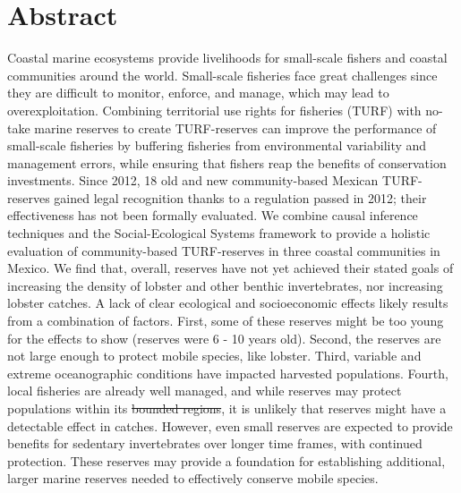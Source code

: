 \documentclass[10pt,letterpaper]{article}
\providecommand{\DIFaddtex}[1]{{\protect\color{blue}\uwave{#1}}} %
\providecommand{\DIFdeltex}[1]{{\protect\color{red}\sout{#1}}}                      %
\providecommand{\DIFaddbegin}{} %
\providecommand{\DIFaddend}{} %
\providecommand{\DIFdelbegin}{} %
\providecommand{\DIFdelend}{} %
\providecommand{\DIFadd}[1]{\texorpdfstring{\DIFaddtex{#1}}{#1}} %
\providecommand{\DIFdel}[1]{\texorpdfstring{\DIFdeltex{#1}}{}} %
\newcommand{\DIFscaledelfig}{0.5}
\newlength{\DIFdelgraphicswidth} %
\newlength{\DIFdelgraphicsheight} %
\newcommand{\DIFaddincludegraphics}[2][]{{\color{blue}\fbox{\DIFOincludegraphics[#1]{#2}}}} %
\newcommand{\DIFdelincludegraphics}[2][]{%
\sbox{\DIFdelgraphicsbox}{\DIFOincludegraphics[#1]{#2}}%
\settoboxwidth{\DIFdelgraphicswidth}{\DIFdelgraphicsbox} %
\settoboxtotalheight{\DIFdelgraphicsheight}{\DIFdelgraphicsbox} %
\scalebox{\DIFscaledelfig}{%
\parbox[b]{\DIFdelgraphicswidth}{\usebox{\DIFdelgraphicsbox}\\[-\baselineskip] \rule{\DIFdelgraphicswidth}{0em}}\llap{\resizebox{\DIFdelgraphicswidth}{\DIFdelgraphicsheight}{%
\setlength{\unitlength}{\DIFdelgraphicswidth}%
\begin{picture}(1,1)%
\thicklines\linethickness{2pt} %
{\color[rgb]{1,0,0}\put(0,0){\framebox(1,1){}}}%
{\color[rgb]{1,0,0}\put(0,0){\line( 1,1){1}}}%
{\color[rgb]{1,0,0}\put(0,1){\line(1,-1){1}}}%
\end{picture}%
}\hspace*{3pt}}} %
} %
\DeclareRobustCommand{\DIFaddbegin}{\DIFOaddbegin \let\includegraphics\DIFaddincludegraphics} %
\DeclareRobustCommand{\DIFaddend}{\DIFOaddend \let\includegraphics\DIFOincludegraphics} %
\DeclareRobustCommand{\DIFdelbegin}{\DIFOdelbegin \let\includegraphics\DIFdelincludegraphics} %
\DeclareRobustCommand{\DIFdelend}{\DIFOaddend \let\includegraphics\DIFOincludegraphics} %
\begin{document}
\section*{Abstract}
Coastal marine ecosystems provide livelihoods for small-scale fishers and coastal communities around the world. Small-scale fisheries face great challenges since they are difficult to monitor, enforce, and manage, which may lead to overexploitation. Combining territorial use rights for fisheries (TURF) with no-take marine reserves to create TURF-reserves can improve the performance of small-scale fisheries by buffering fisheries from environmental variability and management errors, while ensuring that fishers reap the benefits of conservation investments. Since 2012, 18 old and new community-based Mexican TURF-reserves gained legal recognition thanks to a regulation passed in 2012; their effectiveness has not been formally evaluated. We combine causal inference techniques and the Social-Ecological Systems framework to provide a holistic evaluation of community-based TURF-reserves in three coastal communities in Mexico. We find that, overall, reserves have not yet achieved their stated goals of increasing the density of lobster and other benthic invertebrates, nor increasing lobster catches. A lack of clear ecological and socioeconomic effects likely results from a combination of factors. First, some of these reserves might be too young for the effects to show (reserves were 6 - 10  years old). Second, the reserves are not large enough to protect mobile species, like lobster. Third, variable and extreme oceanographic conditions have impacted harvested populations. Fourth, local fisheries are already well managed, and while reserves may protect populations within its \DIFdelbegin \DIFdel{bounded regions}\DIFdelend \DIFaddbegin \DIFadd{boundaries}\DIFaddend , it is unlikely that reserves might have a detectable effect in catches. However, even small reserves are expected to provide benefits for sedentary invertebrates over longer time frames, with continued protection. These reserves may provide a foundation for establishing additional, larger marine reserves needed to effectively conserve mobile species.

\end{document}
